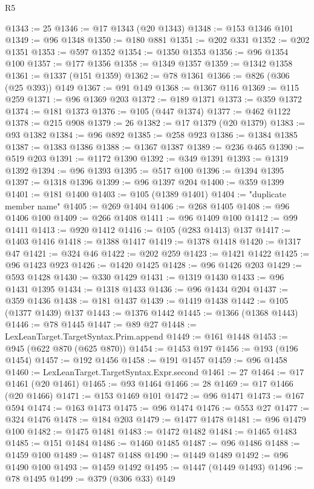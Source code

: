 \begin{lexlean}{R5}
\begin{coremodule}
@1343 := 25
@1346 := @17 @1343 (@20 @1343)
@1348 := @153 @1346 @101
@1349 := @96 @1348
@1350 := @180 @881
@1351 := @202 @331
@1352 := @202 @1351
@1353 := @597 @1352
@1354 := @1350 @1353
@1356 := @96 @1354 @100
@1357 := @177 @1356
@1358 := @1349 @1357
@1359 := @1342 @1358
@1361 := @1337 (@151 @1359)
@1362 := @78 @1361
@1366 := @826 (@306 (@25 @393)) @149
@1367 := @91 @149
@1368 := @1367 @116
@1369 := @115 @259
@1371 := @96 @1369 @203
@1372 := @189 @1371
@1373 := @359 @1372
@1374 := @181 @1373
@1376 := @105 (@447 @1374)
@1377 := @462 @1122
@1378 := @215 @908
@1379 := 26
@1382 := @17 @1379 (@20 @1379)
@1383 := @93 @1382
@1384 := @96 @892
@1385 := @258 @923
@1386 := @1384 @1385
@1387 := @1383 @1386
@1388 := @1367 @1387
@1389 := @236 @465
@1390 := @519 @203
@1391 := @1172 @1390
@1392 := @349 @1391
@1393 := @1319 @1392
@1394 := @96 @1393
@1395 := @517 @100
@1396 := @1394 @1395
@1397 := @1318 @1396
@1399 := @96 @1397 @204
@1400 := @359 @1399
@1401 := @181 @1400
@1403 := @105 (@1389 @1401)
@1404 := "duplicate member name"
@1405 := @269 @1404
@1406 := @268 @1405
@1408 := @96 @1406 @100
@1409 := @266 @1408
@1411 := @96 @1409 @100
@1412 := @99 @1411
@1413 := @920 @1412
@1416 := @105 (@283 @1413) @137
@1417 := @1403 @1416
@1418 := @1388 @1417
@1419 := @1378 @1418
@1420 := @1317 @47
@1421 := @324 @46
@1422 := @202 @259
@1423 := @1421 @1422
@1425 := @96 @1423 @923
@1426 := @1420 @1425
@1428 := @96 @1426 @203
@1429 := @593 @1428
@1430 := @330 @1429
@1431 := @1319 @1430
@1433 := @96 @1431 @1395
@1434 := @1318 @1433
@1436 := @96 @1434 @204
@1437 := @359 @1436
@1438 := @181 @1437
@1439 := @1419 @1438
@1442 := @105 (@1377 @1439) @137
@1443 := @1376 @1442
@1445 := @1366 (@1368 @1443)
@1446 := @78 @1445
@1447 := @89 @27
@1448 := LexLeanTarget.TargetSyntax.Prim.append
@1449 := @161 @1448
@1453 := @945 (@622 @870 (@625 @870))
@1454 := @1453 @197
@1456 := @193 (@196 @1454)
@1457 := @192 @1456
@1458 := @191 @1457
@1459 := @96 @1458
@1460 := LexLeanTarget.TargetSyntax.Expr.second
@1461 := 27
@1464 := @17 @1461 (@20 @1461)
@1465 := @93 @1464
@1466 := 28
@1469 := @17 @1466 (@20 @1466)
@1471 := @153 @1469 @101
@1472 := @96 @1471
@1473 := @167 @594
@1474 := @163 @1473
@1475 := @96 @1474
@1476 := @553 @27
@1477 := @324 @1476
@1478 := @184 @203
@1479 := @1477 @1478
@1481 := @96 @1479 @100
@1482 := @1475 @1481
@1483 := @1472 @1482
@1484 := @1465 @1483
@1485 := @151 @1484
@1486 := @1460 @1485
@1487 := @96 @1486
@1488 := @1459 @100
@1489 := @1487 @1488
@1490 := @1449 @1489
@1492 := @96 @1490 @100
@1493 := @1459 @1492
@1495 := @1447 (@1449 @1493)
@1496 := @78 @1495
@1499 := @379 (@306 @33) @149

\end{coremodule}
\end{lexlean}
